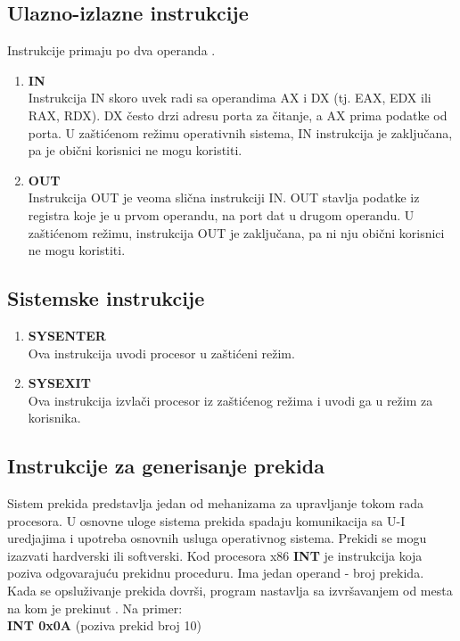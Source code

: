 \documentclass[a4paper]{article}
\begin{document}
\subsection{\textbf{Ulazno-izlazne instrukcije}}
Instrukcije primaju po dva operanda \cite{x86Assembly}.
\begin{enumerate}
\item{\textbf{IN}}\\
Instrukcija IN skoro uvek radi sa operandima AX i DX (tj. EAX, EDX ili RAX, RDX). DX \v cesto drzi adresu porta za \v citanje, a AX prima podatke od porta.
U za\v sti\' cenom re\v zimu operativnih sistema, IN instrukcija je zaklju\v cana, pa je obi\v cni korisnici ne mogu koristiti.\\
\item{\textbf{OUT}}\\
Instrukcija OUT je veoma sli\v cna instrukciji IN. OUT stavlja podatke iz registra koje je u prvom operandu, na port dat u drugom operandu. U za\v sti\' cenom
re\v zimu, instrukcija OUT je zaklju\v cana, pa ni nju obi\v cni korisnici ne mogu koristiti.\\
\end{enumerate} %


\subsection{\textbf{Sistemske instrukcije}}
\begin{enumerate}
\item{\textbf{SYSENTER}}\\
Ova instrukcija uvodi procesor u za\v sti\' ceni re\v zim.
\item{\textbf{SYSEXIT}} \\
Ova instrukcija izvla\v ci procesor iz za\v sti\' cenog re\v zima i uvodi ga u re\v zim za korisnika.
\end{enumerate} %

\subsection{\textbf{Instrukcije za generisanje prekida}}
Sistem prekida predstavlja jedan od mehanizama za upravljanje tokom rada procesora. U osnovne
uloge sistema prekida spadaju komunikacija sa U-I uredjajima i upotreba osnovnih usluga operativnog sistema.
Prekidi se mogu izazvati hardverski ili softverski. Kod procesora x86 \textbf{INT}
je instrukcija koja poziva odgovaraju\' cu prekidnu proceduru. Ima jedan operand - broj prekida. 
Kada se opslu\v zivanje prekida dovr\v si, program nastavlja sa izvr\v savanjem od mesta na kom je 
prekinut \cite{x86Assembly}. Na primer:\\
\textbf{INT 0x0A} (poziva prekid broj 10) 
\end{document}
